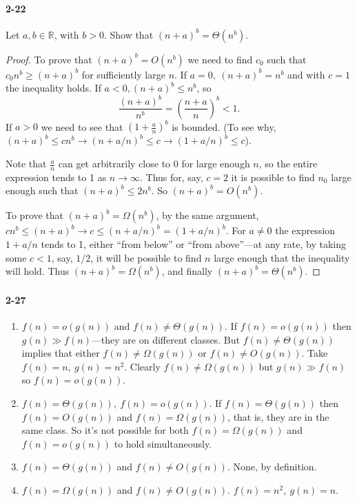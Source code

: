 \documentclass{report}
\newcommand{\R}{\mathbb{R}}
\begin{document}
\paragraph{2-22} Let $a, b \in \R$, with $b > 0$. Show that $(n+a)^b = \Theta(n^b)$.

\begin{proof}
To prove that $(n+a)^b = O(n^b)$ we need to find $c_0$ such that $c_0 n^b \ge (n+a)^b$ for sufficiently large $n$. If $a=0,\ (n+a)^b = n^b$ and with $c=1$ the inequality holds. If $a<0, (n+a)^b \le n^b$, so
\begin{equation*}
	\frac{(n+a)^b}{n^b} = \left(\frac{n+a}{n}\right)^b < 1.
\end{equation*}
If $a>0$ we need to see that $\left(1 + \frac{a}{n}\right)^b$ is bounded. (To see why, $(n+a)^b \le c n^b \rightarrow (n+a/n)^b \le c \rightarrow (1 + a/n)^b \le c$).

Note that $\frac{a}{n}$ can get arbitrarily close to 0 for large enough $n$, so the entire expression tends to 1 as $n\to\infty$. Thus for, say, $c=2$ it is possible to find $n_0$ large enough such that $(n+a)^b \le 2n^b$. So $(n+a)^b = O(n^b)$.

\medskip

To prove that $(n+a)^b = \Omega(n^b)$, by the same argument, $c n^b \le (n+a)^b \rightarrow c \le (n+a/n)^b = (1 + a/n)^b$. For $a\ne0$ the expression $1+a/n$ tends to 1, either ``from below'' or ``from above''---at any rate, by taking some $c<1$, say, $1/2$, it will be possible to find $n$ large enough that the inequality will hold. Thus $(n+a)^b = \Omega(n^b)$, and finally $(n+a)^b = \Theta(n^b)$.
\end{proof}

\paragraph{2-27}
\begin{enumerate}[label=(\alph*)]
	\item $f(n) = o(g(n))$ and $f(n)\ne\Theta(g(n))$. If $f(n) = o(g(n))$ then $g(n)\gg f(n)$---they are on different classes. But $f(n)\ne\Theta(g(n))$ implies that either $f(n)\ne\Omega(g(n))$ or $f(n)\ne O(g(n))$. Take $f(n)=n,\ g(n)=n^2$. Clearly $f(n)\ne\Omega(g(n))$ but $g(n)\gg f(n)$ so $f(n)=o(g(n))$.
	\item $f(n) = \Theta(g(n)),\ f(n) = o(g(n))$. If $f(n)=\Theta(g(n))$ then $f(n)=O(g(n))$ and $f(n)=\Omega(g(n))$, that is, they are in the same class. So it's not possible for both $f(n)=\Omega(g(n))$ and $f(n)=o(g(n))$ to hold simultaneously.
	\item $f(n)=\Theta(g(n))$ and $f(n)\ne O(g(n))$. None, by definition.
	\item $f(n)=\Omega(g(n))$ and $f(n)\ne O(g(n))$. $f(n)=n^2,\ g(n)=n$.
\end{enumerate}
\end{document}
